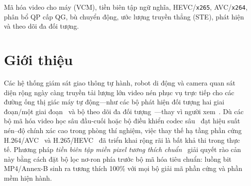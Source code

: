 \documentclass[journal]{IEEEtran}
\begin{document}
\begin{abstract}
\end{abstract}

\begin{IEEEkeywords}
Mã hóa video cho máy (VCM), tiền biên tập ngữ nghĩa, HEVC/\texttt{x265}, AVC/\texttt{x264}, phân bổ QP cấp QG, bù chuyển động, ước lượng truyền thẳng (STE), phát hiện và theo dõi đa đối tượng.
\end{IEEEkeywords}

\section{Giới thiệu}
\label{sec:intro}

Các hệ thống giám sát giao thông tự hành, robot di động và camera quan sát diện rộng ngày càng truyền tải lượng lớn video nén phục vụ trực tiếp cho các đường ống thị giác máy tự động---như các bộ phát hiện đối tượng hai giai đoạn/một giai đoạn~\cite{ren2017fasterrcnn, lin2017retinanet, tian2019fcos} và bộ theo dõi đa đối tượng~\cite{zhang2022bytetrack}---thay vì người xem~\cite{duan2020vcm, gao2021vcm}. Dù các bộ mã hóa video học sâu đầu-cuối hoặc bộ điều khiển codec sâu~\cite{ge2024taskaware} đạt hiệu suất nén--độ chính xác cao trong phòng thí nghiệm, việc thay thế hạ tầng phần cứng H.264/AVC~\cite{wiegand2003avc} và H.265/HEVC~\cite{sullivan2012hevc} đã triển khai rộng rãi là bất khả thi trong thực tế. Phương pháp \textit{tiền biên tập miền pixel tương thích chuẩn}~\cite{lu2024preprocessing, yang2024task, zhao2024preprocessing, dani2026scope} giải quyết rào cản này bằng cách đặt bộ lọc nơ-ron phía trước bộ mã hóa tiêu chuẩn: luồng bit MP4/Annex-B sinh ra tương thích 100\% với mọi bộ giải mã phần cứng và phần mềm hiện hành.
\end{document}
